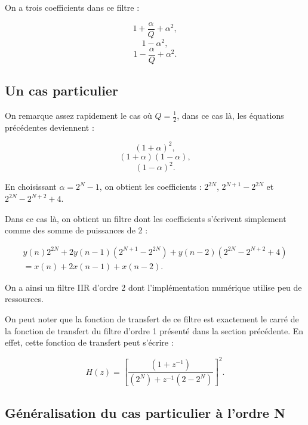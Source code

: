 \documentclass{article}
\begin{document}
On a trois coefficients dans ce filtre :

\begin{equation}
1+\frac{\alpha}{Q}+\alpha^2,
\end{equation}
\begin{equation}
1-\alpha^2,
\end{equation}
\begin{equation}
1-\frac{\alpha}{Q}+\alpha^2.
\end{equation}

\subsection{Un cas particulier}

On remarque assez rapidement le cas où $Q=\frac{1}{2}$, dans ce cas là, les équations précédentes deviennent :

\begin{equation}
(1+\alpha)^2,
\end{equation}
\begin{equation}
(1+\alpha)(1-\alpha),
\end{equation}
\begin{equation}
(1-\alpha)^2.
\end{equation}

En choisissant $\alpha=2^N-1$, on obtient les coefficients : $2^{2N}$, $2^{N+1}-2^{2N}$ et $2^{2N}-2^{N+2}+4$.

Dans ce cas là, on obtient un filtre dont les coefficients s'écrivent simplement comme des somme de puissances de 2 : 

\begin{multline}
y(n)2^{2N}+2y(n-1)(2^{N+1}-2^{2N})+y(n-2)(2^{2N}-2^{N+2}+4)
\\=x(n)+2x(n-1)+x(n-2).
\end{multline}

On a ainsi un filtre IIR d'ordre 2 dont l'implémentation numérique utilise peu de ressources.

On peut noter que la fonction de transfert de ce filtre est exactement le carré de la fonction de transfert du filtre d'ordre 1 présenté dans la section précédente. En effet, cette fonction de transfert peut s'écrire :

\begin{equation}
H(z) = \left[ \frac{(1+z^{-1})}{(2^{N})+z^{-1}(2-2^{N})} \right]^2. 
\end{equation}

\subsection{Généralisation du cas particulier à l'ordre N}
\end{document}
